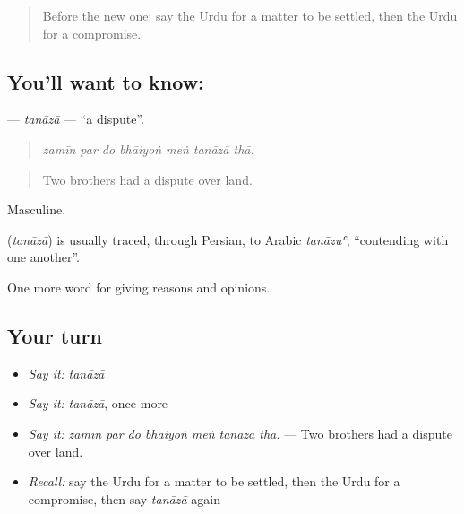 \label{lesson:UR-C347-tanaza}



\begin{quote}
Before the new one: say the Urdu for a matter to be settled, then the Urdu for a compromise.
\end{quote}

\subsection*{You'll want to know: }
\textbf{} — \emph{tanāzā} — \textquotedblleft{}a dispute\textquotedblright{}.

\begin{quote}
      
\end{quote}

\begin{quote}
\emph{zamīn par do bhāiyoṅ meṅ tanāzā thā.}
\end{quote}

\begin{quote}
Two brothers had a dispute over land.
\end{quote}

Masculine.

\begin{cousinweb}
\textbf{} (\emph{tanāzā}) is usually traced, through Persian, to Arabic \emph{tanāzuʿ}, \textquotedblleft{}contending with one another\textquotedblright{}.
\end{cousinweb}

\begin{grammarlens}[title={What you've built}]
One more word for giving reasons and opinions.
\end{grammarlens}

\subsection*{Your turn}
\begin{itemize}
\raggedright
  \item \emph{Say it:} \emph{tanāzā}
  \item \emph{Say it:} \emph{tanāzā}, once more
  \item \emph{Say it:} \emph{zamīn par do bhāiyoṅ meṅ tanāzā thā.} — Two brothers had a dispute over land.
  \item \emph{Recall:} say the Urdu for a matter to be settled, then the Urdu for a compromise, then say \emph{tanāzā} again
\end{itemize}


